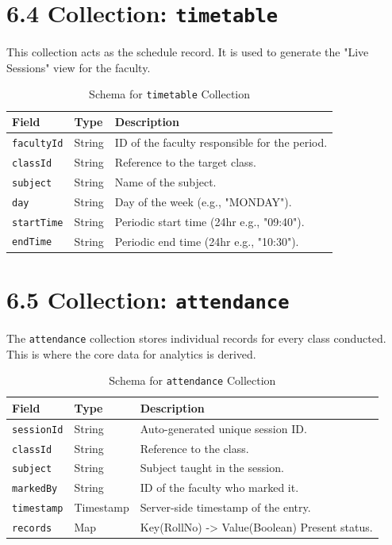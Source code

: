\documentclass[12pt,a4paper]{report}
\begin{document}
\section*{6.4 Collection: \texttt{timetable}}
This collection acts as the schedule record. It is used to generate the "Live Sessions" view for the faculty.

\begin{table}[H]
    \centering
    \caption{Schema for \texttt{timetable} Collection}
    \begin{tabularx}{\linewidth}{llX}
        \toprule
        \textbf{Field} & \textbf{Type} & \textbf{Description} \\
        \midrule
        \texttt{facultyId} & String & ID of the faculty responsible for the period. \\
        \texttt{classId} & String & Reference to the target class. \\
        \texttt{subject} & String & Name of the subject. \\
        \texttt{day} & String & Day of the week (e.g., "MONDAY"). \\
        \texttt{startTime} & String & Periodic start time (24hr e.g., "09:40"). \\
        \texttt{endTime} & String & Periodic end time (24hr e.g., "10:30"). \\
        \bottomrule
    \end{tabularx}
\end{table}

\section*{6.5 Collection: \texttt{attendance}}
The \texttt{attendance} collection stores individual records for every class conducted. This is where the core data for analytics is derived.

\begin{table}[H]
    \centering
    \caption{Schema for \texttt{attendance} Collection}
    \begin{tabularx}{\linewidth}{llX}
        \toprule
        \textbf{Field} & \textbf{Type} & \textbf{Description} \\
        \midrule
        \texttt{sessionId} & String & Auto-generated unique session ID. \\
        \texttt{classId} & String & Reference to the class. \\
        \texttt{subject} & String & Subject taught in the session. \\
        \texttt{markedBy} & String & ID of the faculty who marked it. \\
        \texttt{timestamp} & Timestamp & Server-side timestamp of the entry. \\
        \texttt{records} & Map & Key(RollNo) -> Value(Boolean) Present status. \\
        \bottomrule
    \end{tabularx}
\end{table}
\end{document}
